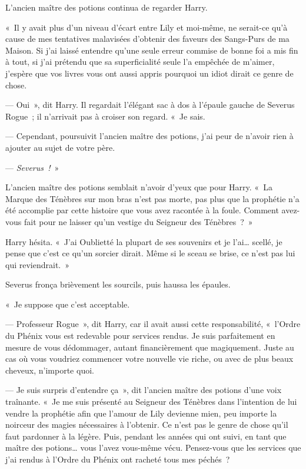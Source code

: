 L'ancien maître des potions continua de regarder Harry.

«~Il y avait plus d'un niveau d'écart entre Lily et moi-même, ne serait-ce qu'à cause de mes tentatives malavisées d'obtenir des faveurs des Sangs-Purs de ma Maison.
Si j'ai laissé entendre qu'une seule erreur commise de bonne foi a mis fin à tout, si j'ai prétendu que sa superficialité seule l'a empêchée de m'aimer, j'espère que vos livres vous ont aussi appris pourquoi un idiot dirait ce genre de chose.

--- Oui~», dit Harry.
Il regardait l'élégant sac à dos à l'épaule gauche de Severus Rogue~; il n'arrivait pas à croiser son regard.
«~Je sais.

--- Cependant, poursuivit l'ancien maître des potions, j'ai peur de n'avoir rien à ajouter au sujet de votre père.

--- \emph{Severus~!}~»

L'ancien maître des potions semblait n'avoir d'yeux que pour Harry.
«~La Marque des Ténèbres sur mon bras n'est pas morte, pas plus que la prophétie n'a été accomplie par cette histoire que vous avez racontée à la foule.
Comment avez-vous fait pour ne laisser qu'un vestige du Seigneur des Ténèbres~?~»

Harry hésita.
«~J'ai Oublietté la plupart de ses souvenirs et je l'ai… scellé, je pense que c'est ce qu'un sorcier dirait.
Même si le sceau se brise, ce n'est pas lui qui reviendrait.~»

Severus fronça brièvement les sourcils, puis haussa les épaules.

«~Je suppose que c'est acceptable.

--- Professeur Rogue~», dit Harry, car il avait aussi cette responsabilité, «~l'Ordre du Phénix vous est redevable pour services rendus.
Je suis parfaitement en mesure de vous dédommager, autant financièrement que magiquement.
Juste au cas où vous voudriez commencer votre nouvelle vie riche, ou avec de plus beaux cheveux, n'importe quoi.

--- Je suis surpris d'entendre ça~», dit l'ancien maître des potions d'une voix traînante.
«~Je me suis présenté au Seigneur des Ténèbres dans l'intention de lui vendre la prophétie afin que l'amour de Lily devienne mien, peu importe la noirceur des magies nécessaires à l'obtenir.
Ce n'est pas le genre de chose qu'il faut pardonner à la légère.
Puis, pendant les années qui ont suivi, en tant que maître des potions… vous l'avez vous-même vécu.
Pensez-vous que les services que j'ai rendus à l'Ordre du Phénix ont racheté tous mes péchés~?

